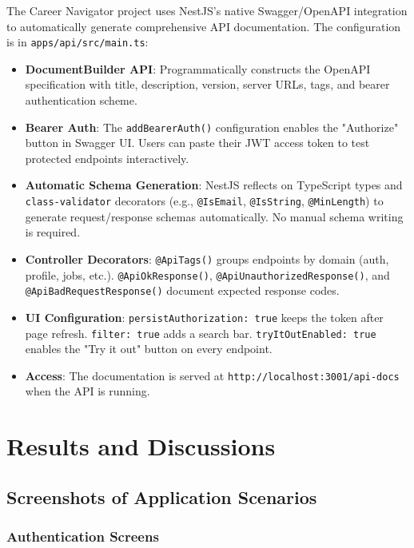 \documentclass[12pt,a4paper]{report}
\begin{document}
The Career Navigator project uses NestJS's native Swagger/OpenAPI integration to automatically generate comprehensive API documentation. The configuration is in \texttt{apps/api/src/main.ts}:

\begin{itemize}
    \item \textbf{DocumentBuilder API}: Programmatically constructs the OpenAPI specification with title, description, version, server URLs, tags, and bearer authentication scheme.
    \item \textbf{Bearer Auth}: The \texttt{addBearerAuth()} configuration enables the "Authorize" button in Swagger UI. Users can paste their JWT access token to test protected endpoints interactively.
    \item \textbf{Automatic Schema Generation}: NestJS reflects on TypeScript types and \texttt{class-validator} decorators (e.g., \texttt{@IsEmail}, \texttt{@IsString}, \texttt{@MinLength}) to generate request/response schemas automatically. No manual schema writing is required.
    \item \textbf{Controller Decorators}: \texttt{@ApiTags()} groups endpoints by domain (auth, profile, jobs, etc.). \texttt{@ApiOkResponse()}, \texttt{@ApiUnauthorizedResponse()}, and \texttt{@ApiBadRequestResponse()} document expected response codes.
    \item \textbf{UI Configuration}: \texttt{persistAuthorization: true} keeps the token after page refresh. \texttt{filter: true} adds a search bar. \texttt{tryItOutEnabled: true} enables the "Try it out" button on every endpoint.
    \item \textbf{Access}: The documentation is served at \texttt{http://localhost:3001/api-docs} when the API is running.
\end{itemize}

\chapter{Results and Discussions}

\section{Screenshots of Application Scenarios}

\subsection{Authentication Screens}
\end{document}
